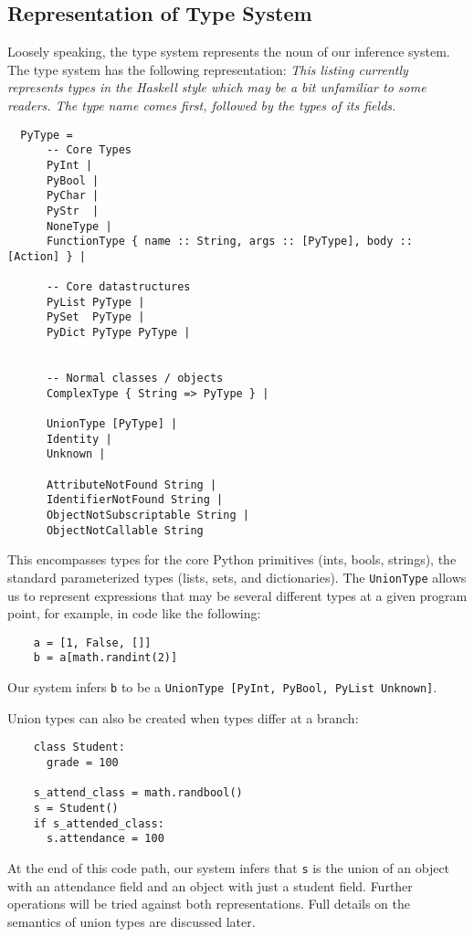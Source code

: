 \documentclass{article}[12pt]
\begin{document}
\subsection{Representation of Type System} 

Loosely speaking, the type system represents the noun of our inference system. The type system has
the following representation:
\emph{This listing currently represents types in the Haskell style which may be a bit unfamiliar to
some readers. The type name comes first, followed by the types of its fields.}
\begin{verbatim}
  PyType = 
      -- Core Types
      PyInt | 
      PyBool | 
      PyChar |
      PyStr  |
      NoneType |
      FunctionType { name :: String, args :: [PyType], body :: [Action] } | 

      -- Core datastructures
      PyList PyType | 
      PySet  PyType |
      PyDict PyType PyType | 


      -- Normal classes / objects
      ComplexType { String => PyType } | 

      UnionType [PyType] | 
      Identity |
      Unknown |

      AttributeNotFound String |
      IdentifierNotFound String |
      ObjectNotSubscriptable String |
      ObjectNotCallable String 
\end{verbatim}

This encompasses types for the core Python primitives (ints, bools, strings), the standard
parameterized types (lists, sets, and dictionaries). The \texttt{UnionType} allows us to represent expressions that may be several different types at a given program point, for example, in code like the following:

\begin{verbatim}
    a = [1, False, []]
    b = a[math.randint(2)]
\end{verbatim}

Our system infers \verb=b= to be a \verb=UnionType [PyInt, PyBool, PyList Unknown]=.

Union types can also be created when types differ at a branch:
\begin{verbatim}
    class Student:
      grade = 100

    s_attend_class = math.randbool()
    s = Student()
    if s_attended_class:
      s.attendance = 100
\end{verbatim}
At the end of this code path, our system infers that \texttt{s} is the union of an object with an attendance field and an
object with just a student field. Further operations will be tried against both representations. Full details on the
semantics of union types are discussed later.
\end{document}
